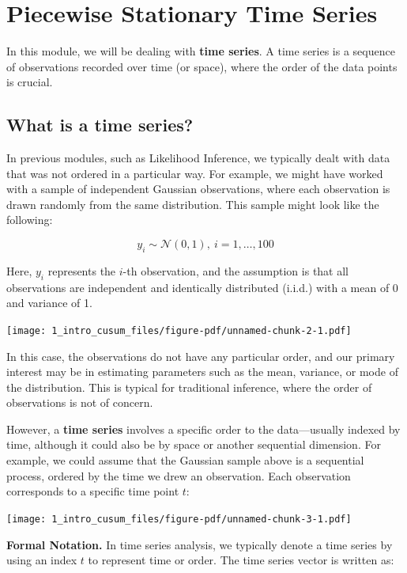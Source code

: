 \documentclass[
  letterpaper,
  DIV=11,
  numbers=noendperiod]{scrreprt}
\begin{document}
\section{Piecewise Stationary Time
Series}\label{piecewise-stationary-time-series}

In this module, we will be dealing with \textbf{time series}. A time
series is a sequence of observations recorded over time (or space),
where the order of the data points is crucial.

\subsection{What is a time series?}\label{what-is-a-time-series}

In previous modules, such as Likelihood Inference, we typically dealt
with data that was not ordered in a particular way. For example, we
might have worked with a sample of independent Gaussian observations,
where each observation is drawn randomly from the same distribution.
This sample might look like the following:

\[
  y_i \sim \mathcal{N}(0,1), \ i = 1, \dots, 100
\]

Here, \(y_i\) represents the \(i\)-th observation, and the assumption is
that all observations are independent and identically distributed
(i.i.d.) with a mean of 0 and variance of 1.

\texttt{[image: 1\_intro\_cusum\_files/figure-pdf/unnamed-chunk-2-1.pdf]}

In this case, the observations do not have any particular order, and our
primary interest may be in estimating parameters such as the mean,
variance, or mode of the distribution. This is typical for traditional
inference, where the order of observations is not of concern.

However, a \textbf{time series} involves a specific order to the
data---usually indexed by time, although it could also be by space or
another sequential dimension. For example, we could assume that the
Gaussian sample above is a sequential process, ordered by the time we
drew an observation. Each observation corresponds to a specific time
point \(t\):

\texttt{[image: 1\_intro\_cusum\_files/figure-pdf/unnamed-chunk-3-1.pdf]}

\textbf{Formal Notation.} In time series analysis, we typically denote a
time series by using an index \(t\) to represent time or order. The time
series vector is written as:
\end{document}
